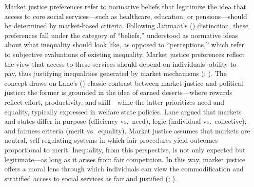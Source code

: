 \documentclass[
  13pt,
]{article}
\begin{document}
Market justice preferences refer to normative beliefs that legitimize
the idea that access to core social services---such as healthcare,
education, or pensions---should be determined by market-based criteria.
Following Janmaat's () distinction, these preferences fall under the category of
``beliefs,'' understood as normative ideas about what inequality should
look like, as opposed to ``perceptions,'' which refer to subjective
evaluations of existing inequality. Market justice preferences reflect
the view that access to these services should depend on individuals'
ability to pay, thus justifying inequalities generated by market
mechanisms (; ). The concept draws
on Lane's () classic contrast
between market justice and political justice: the former is grounded in
the idea of earned deserts---where rewards reflect effort, productivity,
and skill---while the latter prioritizes need and equality, typically
expressed in welfare state policies. Lane argued that markets and states
differ in purpose (efficiency vs.~need), logic (individual
vs.~collective), and fairness criteria (merit vs.~equality). Market
justice assumes that markets are neutral, self-regulating systems in
which fair procedures yield outcomes proportional to merit. Inequality,
from this perspective, is not only expected but legitimate---as long as
it arises from fair competition. In this way, market justice offers a
moral lens through which individuals can view the commodification and
stratified access to social services as fair and justified
(;
).
\end{document}

